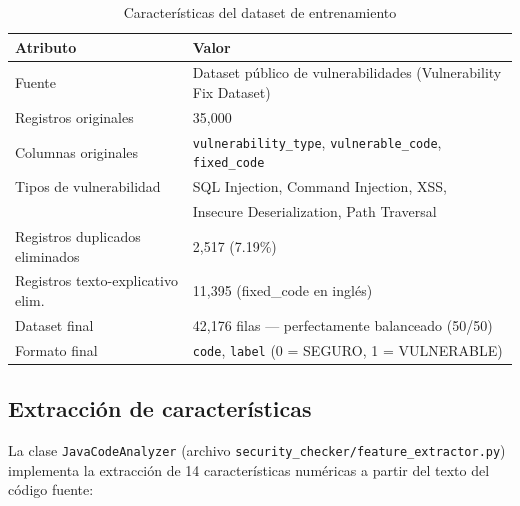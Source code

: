 \documentclass[12pt,a4paper]{article}
\begin{document}
\begin{table}[H]
\centering
\begin{tabular}{@{}ll@{}}
\toprule
\textbf{Atributo}        & \textbf{Valor} \\
\midrule
Fuente                   & Dataset público de vulnerabilidades (Vulnerability Fix Dataset) \\
Registros originales     & 35,000 \\
Columnas originales      & \texttt{vulnerability\_type}, \texttt{vulnerable\_code}, \texttt{fixed\_code} \\
Tipos de vulnerabilidad  & SQL Injection, Command Injection, XSS, \\
                         & Insecure Deserialization, Path Traversal \\
Registros duplicados eliminados  & 2,517 (7.19\%) \\
Registros texto-explicativo elim. & 11,395 (fixed\_code en inglés) \\
Dataset final            & 42,176 filas — perfectamente balanceado (50/50) \\
Formato final            & \texttt{code}, \texttt{label} (0 = SEGURO, 1 = VULNERABLE) \\
\bottomrule
\end{tabular}
\caption{Características del dataset de entrenamiento}
\end{table}

\subsection{Extracción de características}

La clase \texttt{JavaCodeAnalyzer} (archivo \texttt{security\_checker/feature\_extractor.py}) implementa la extracción de 14 características numéricas a partir del texto del código fuente:
\end{document}
